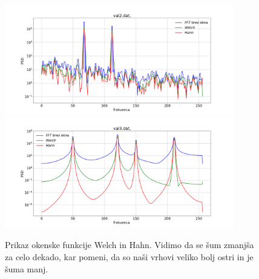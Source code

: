 \documentclass[11pt, a4paper]{article}
\begin{document}
\begin{figure}[H]

\hspace{-2cm}
\includegraphics[width=10cm]{prva_tretji1.png}
\includegraphics[width=10cm]{prva_tretja1b.png}

\caption{Prikaz okenske funkcije Welch in Hahn. Vidimo da se šum zmanjša za celo dekado, kar pomeni, da so naši vrhovi veliko bolj ostri in je šuma manj.} 
\end{figure}
\end{document}
